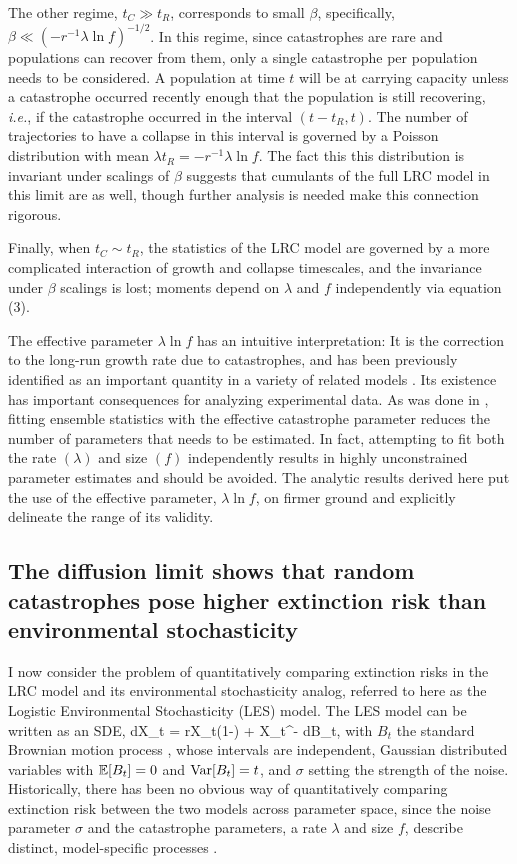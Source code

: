 The other regime, $t_C \gg t_R$, corresponds to small $\beta$, specifically, $\beta \ll (-r^{-1}\lambda\ln f)^{-1/2}$.  In this regime, since catastrophes are rare and populations can recover from them, only a single catastrophe per population needs to be considered.  A population at time $t$ will be at carrying capacity unless a catastrophe occurred recently enough that the population is still recovering, \textit{i.e.}, if the catastrophe occurred in the interval $(t-t_R,t)$.  The number of trajectories to have a collapse in this interval is governed by a Poisson distribution with mean $\lambda t_R = -r^{-1}\lambda\ln f $.  The fact this this distribution is invariant under scalings of $\beta$ suggests that cumulants of the full LRC model in this limit are as well, though further analysis is needed make this connection rigorous. 

Finally, when $t_C \sim t_R$, the statistics of the LRC model are governed by a more complicated interaction of growth and collapse timescales, and the invariance under $\beta$ scalings is lost; moments depend on $\lambda$ and $f$ independently via equation (3).

The effective parameter $\lambda\ln f$ has an intuitive interpretation:  It is the correction to the long-run growth rate due to catastrophes, and has been previously identified as an important quantity in a variety of related models \cite{bao2011competitive,hansonBook,lande1993risks}.  Its existence has important consequences for analyzing experimental data.  As was done in \cite{wilesPLOS2016}, fitting ensemble statistics with the effective catastrophe parameter reduces the number of parameters that needs to be estimated.  In fact, attempting to fit both the rate $(\lambda)$ and size $(f)$ independently results in highly unconstrained parameter estimates  \cite{wilesPLOS2016} and should be avoided.  The analytic results derived here put the use of the effective parameter, $\lambda\ln f$, on firmer ground and explicitly delineate the range of its validity.  


\subsection{The diffusion limit shows that random catastrophes pose higher extinction risk than environmental stochasticity}

I now consider the problem of quantitatively comparing extinction risks in the LRC model and its environmental stochasticity analog, referred to here as the Logistic Environmental Stochasticity (LES) model.  The LES model can be written as an SDE,
\be
dX_t = rX_t\left(1-\right) + \sigma X_{t^-} dB_t,
\ee
\noindent with $B_t$ the standard Brownian motion process \cite{hansonBook,karlin1981second}, whose intervals are independent, Gaussian distributed variables with $\mathbb{E}[B_t] = 0$ and $\text{Var}[B_t] = t$,  and $\sigma$ setting the strength of the noise.  Historically, there has been no obvious way of quantitatively comparing extinction risk between the two models across parameter space, since the noise parameter $\sigma$ and the catastrophe parameters, a rate $\lambda$ and size $f$, describe distinct, model-specific processes \cite{lande1993risks, landeBook, shaffer1987minimum}.  

